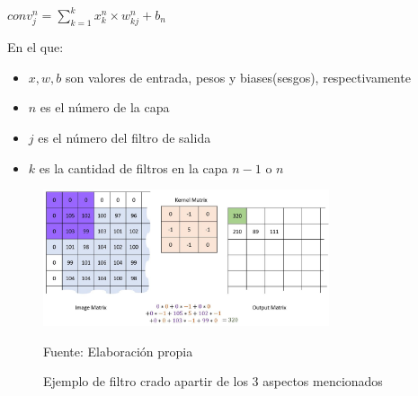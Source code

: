 		\begingroup\makeatletter{}\check@mathfonts
		\begin{center}
		${conv_j^n} ={\sum_{k=1}^k x_k^n \times w_{kj} ^n + b_n}$
		\end{center}
		\endgroup
		
		En el que:\vskip 0.1cm
		\begin{itemize}
			\item $x,w,b$ son valores de entrada, pesos y biases(sesgos), respectivamente
			\item $n$ es el número de la capa
			\item $j$ es el número del filtro de salida
			\item $k$ es la cantidad de filtros en la capa $n-1$ o $n$
		\end{itemize}


		\begin{figure}[H]
		\begin{center}
		\includegraphics[width=0.75\textwidth]{images/marcoteorico/Convolution_calculation_borders}
		\end{center}
		\begin{center}
		\caption{\small{Ejemplo de filtro crado apartir de los 3 aspectos mencionados}}
		{\small{Fuente: Elaboración propia}}
		\end{center}
		\vspace{-1.9em}
		\end{figure}
 
